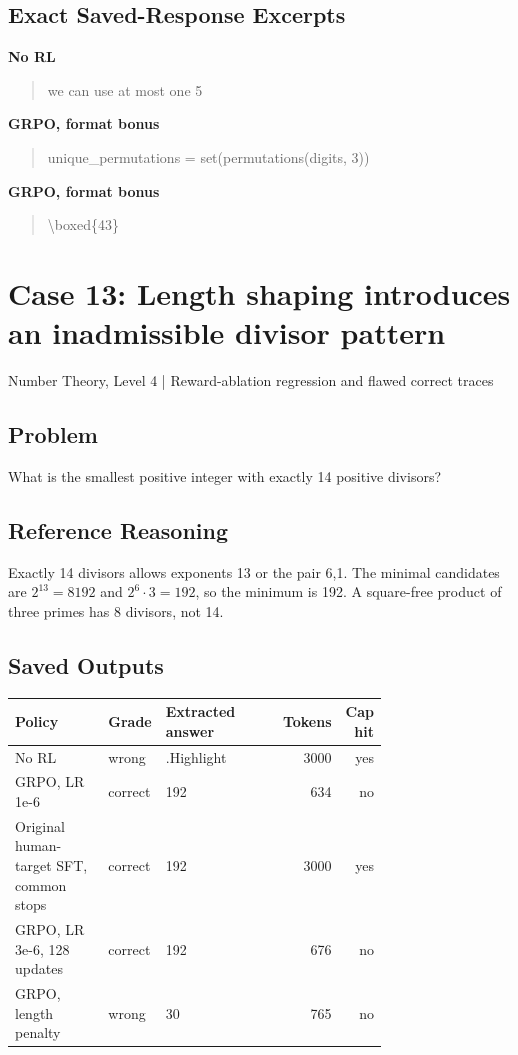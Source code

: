 \documentclass[10pt,letterpaper]{article}
\begin{document}
\subsection*{Exact Saved-Response Excerpts}
\textbf{No RL}
\begin{quote}\small\raggedright we can use at most one 5\end{quote}
\textbf{GRPO, format bonus}
\begin{quote}\small\raggedright unique\_permutations = set(permutations(digits, 3))\end{quote}
\textbf{GRPO, format bonus}
\begin{quote}\small\raggedright \textbackslash{}boxed\{43\}\end{quote}
\clearpage\section*{Case 13: Length shaping introduces an inadmissible divisor pattern}
Number Theory, Level 4 | Reward-ablation regression and flawed correct traces
\subsection*{Problem}
What is the smallest positive integer with exactly 14 positive divisors?
\subsection*{Reference Reasoning}
Exactly 14 divisors allows exponents 13 or the pair 6,1. The minimal candidates are $2^{13}=8192$ and $2^6\cdot3=192$, so the minimum is 192. A square-free product of three primes has 8 divisors, not 14.
\subsection*{Saved Outputs}
\small\begin{longtable}{p{0.29\linewidth}p{0.10\linewidth}p{0.35\linewidth}rr}\toprule Policy & Grade & Extracted answer & Tokens & Cap hit\\\midrule
No RL & wrong & .Highlight & 3000 & yes\\
GRPO, LR 1e-6 & correct & 192 & 634 & no\\
Original human-target SFT, common stops & correct & 192 & 3000 & yes\\
GRPO, LR 3e-6, 128 updates & correct & 192 & 676 & no\\
GRPO, length penalty & wrong & 30 & 765 & no\\
\bottomrule\end{longtable}\normalsize
\end{document}
